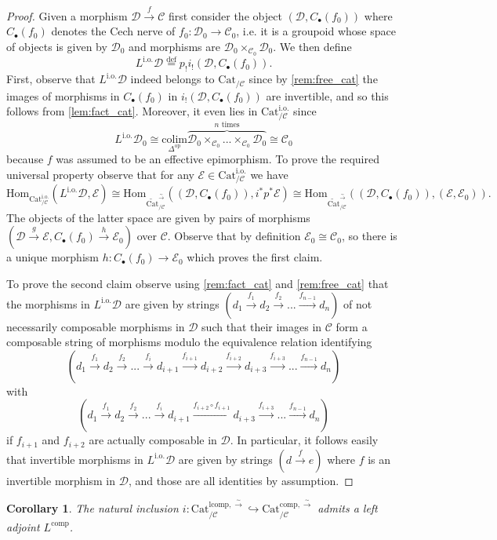 \documentclass[a4paper, reqno]{amsart}
\newtheorem{cor}[theorem]{Corollary}
\theoremstyle{definition}
\newcommand\cC{\mathscr C}
\newcommand\cD{\mathscr D}
\newcommand\cE{\mathscr E}
\newcommand\mor{\mathrm{Hom}}
\newcommand\op{\mathrm{op}}
\newcommand\cat{\mathrm{Cat}}
\newcommand\comp{\mathrm{comp}}
\newcommand\lcomp{\mathrm{lcomp}}
\newcommand\colim{\mathrm{colim}}
\newcommand\bydef{\overset{\mathrm{def}}{=}}
\newcommand\bo{\mathrm{i.o.}}
\newcommand\wrr{{\overset{\sim}{\rightarrow}}}
\begin{document}
\begin{proof}
Given a morphism $\cD\xrightarrow{f}\cC$ first consider the object $(\cD,C_\bullet(f_0))$ where $C_\bullet(f_0)$ denotes the Cech nerve of $f_0:\cD_0\rightarrow\cC_0$, i.e. it is a groupoid whose space of objects is given by $\cD_0$ and morphisms are $\cD_0\times_{\cC_0}\cD_0$. We then define
\[L^\bo\cD\bydef p_! i_! (\cD,C_\bullet(f_0)).\]
First, observe that $L^\bo\cD$ indeed belongs to $\cat_{/\cC}$ since by \cref{rem:free_cat} the images of morphisms in $C_\bullet(f_0)$ in $ i_! (\cD,C_\bullet(f_0))$ are invertible, and so this follows from \cref{lem:fact_cat}. Moreover, it even lies in $\cat^\bo_{/\cC}$ since
\[L^\bo\cD_0\cong\underset{\Delta^\op}{\colim}\overbrace{\cD_0\times_{\cC_0}...\times_{\cC_0}\cD_0}^\text{$n$ times}\cong\cC_0\]
because $f$ was assumed to be an effective epimorphism. To prove the required universal property observe that for any $\cE\in\cat^\bo_{/\cC}$ we have 
\[\mor_{\cat^\bo_{/\cC}}(L^\bo\cD,\cE)\cong\mor_{\widetilde{\cat}^\wrr_{/\cC}}((\cD,C_\bullet(f_0)),i^*p^*\cE)\cong\mor_{\widetilde{\cat}^\wrr_{/\cC}}((\cD,C_\bullet(f_0)),(\cE,\cE_0)).\]
The objects of the latter space are given by pairs of morphisms  $(\cD\xrightarrow{g}\cE,C_\bullet(f_0)\xrightarrow{h}\cE_0)$ over $\cC$. Observe that by definition $\cE_0\cong\cC_0$, so there is a unique morphism $h:C_\bullet(f_0)\rightarrow\cE_0$ which proves the first claim.\par
To prove the second claim observe using \cref{rem:fact_cat} and \cref{rem:free_cat} that the morphisms in $L^\bo\cD$ are given by strings $(d_1\xrightarrow{f_1}d_2\xrightarrow{f_2}...\xrightarrow{f_{n-1}}d_n)$ of not necessarily composable morphisms in $\cD$ such that their images in $\cC$ form a composable string of morphisms modulo the equivalence relation identifying \[(d_1\xrightarrow{f_1}d_2\xrightarrow{f_2}...\xrightarrow{f_i}d_{i+1}\xrightarrow{f_{i+1}}d_{i+2}\xrightarrow{f_{i+2}}d_{i+3}\xrightarrow{f_{i+3}}...\xrightarrow{f_{n-1}}d_n)\] with 
\[(d_1\xrightarrow{f_1}d_2\xrightarrow{f_2}...\xrightarrow{f_i}d_{i+1}\xrightarrow{f_{i+2}\circ f_{i+1}}d_{i+3}\xrightarrow{f_{i+3}}...\xrightarrow{f_{n-1}}d_n)\]
if $f_{i+1}$ and $f_{i+2}$ are actually composable in $\cD$. In particular, it follows easily that invertible morphisms in $L^\bo\cD$ are given by strings $(d\xrightarrow{f}e)$ where $f$ is an invertible morphism in $\cD$, and those are all identities by assumption.
\end{proof}
\begin{cor}\label{cor:adj_comp}
The natural inclusion $i:\cat^{\lcomp,\wrr}_{/\cC}\hookrightarrow\cat^{\comp,\wrr}_{/\cC}$ admits a left adjoint $L^\comp$.
\end{cor}
\end{document}
